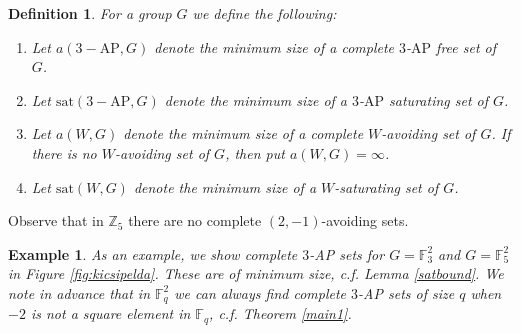 \documentclass[11pt]{article}
\numberwithin{table}{section}
\newcommand{\F}{{\mathbb F}}
\newcommand{\sat}{\mathrm{sat}}
\newtheorem{definition}[theorem]{Definition}
\newtheorem{example}[theorem]{Example}
\theoremstyle{definition}
\begin{document}
	\begin{definition}
		For a group $G$ we define the following: \vspace{-0.2cm}
		\begin{enumerate}[\rm(1)]\vspace{-0.2cm}
			\item  Let $a(3-\mathrm{AP}, G)$ denote the minimum size of a complete $3$-$\mathrm{AP}$ free set of $G$.\vspace{-0.2cm}
			\item  Let $\sat(3-\mathrm{AP}, G)$ denote the minimum size of a $3$-$\mathrm{AP}$ saturating set of $G$.\vspace{-0.2cm}
			\item  Let $a(W, G)$ denote the minimum size of a complete $W$-avoiding set of $G$. If there is no $W$-avoiding set of $G$, then put $a(W,G)=\infty$.\vspace{-0.2cm}
			\item  Let $\sat(W, G)$ denote the minimum size of a $W$-saturating set of $G$.\vspace{-0.2cm}
		\end{enumerate}
	\end{definition}
	
	Observe that in $\mathbb{Z}_5$ there are no complete $(2,-1)$-avoiding sets.
	
	\begin{example} As an example, we show complete $3$-AP sets for $G=\F_3^2$ and $G=\F_5^2$ in Figure \ref{fig:kicsipelda}. These are of minimum size, c.f. Lemma \ref{satbound}. We note in advance that in $\F_q^2$ we can always find complete $3$-AP sets of size $q$ when $-2$ is not a square element in $\F_q$, c.f. Theorem \ref{main1}.
	\end{example}
	
\end{document}
